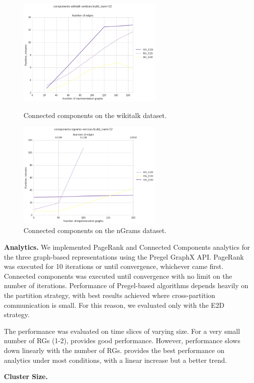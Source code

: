 \begin{figure}
\centering
\begin{minipage}{3.3in}
\centering
\includegraphics[width=2.8in]{figs/cc_wikitalk_build12.png}
\caption{Connected components on the wikitalk dataset.}
\label{fig:ccwiki}
\end{minipage}
\begin{minipage}{3.3in}
\centering
\includegraphics[width=2.8in]{figs/cc_ngrams_build12.png}
\caption{Connected components on the nGrams dataset.}
\label{fig:ccngrams}
\end{minipage}
\end{figure}

{\bf Analytics.}  We implemented PageRank and Connected Components
analytics for the three graph-based representations using the Pregel
GraphX API.  PageRank was executed for 10 iterations or until
convergence, whichever came first.  Connected components was executed
until convergence with no limit on the number of iterations.
Performance of Pregel-based algorithms depends heavily on the
partition strategy, with best results achieved where cross-partition
communication is small.  For this reason, we evaluated only with the
E2D strategy.

The performance was evaluated on time slices of varying size.  For a
very small number of RGs (1-2), \sg provides good performance.
However, \sg performance slows down linearly with the number of RGs.
\hg provides the best performance on analytics under most conditions,
with a linear increase but a better trend. 

{\bf Cluster Size.}  

